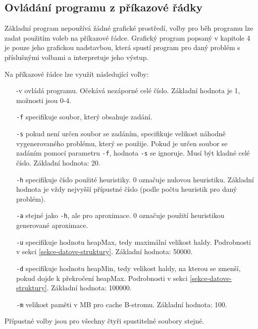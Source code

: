 \documentclass[12pt,notitlepage,fleqn]{report} %
\theoremstyle{definition}
\newcommand{\code}[1]{\texttt{#1}}
\begin{document}
  \subsection{Ovládání programu z příkazové řádky}
  Základní program nepoužívá žádné grafické prostředí, volby pro běh programu lze zadat použitím voleb na příkazové řádce. Grafický program popsaný v kapitole 4 je pouze jeho grafickou nadstavbou, která spustí program pro daný problém s příslušnými volbami a interpretuje jeho výstup.
  
  Na příkazové řádce lze využít následující volby:
  \begin{enumerate}
   \item[-v] ovládá  programu. Očekává nezáporné celé číslo. Základní hodnota je 1, možnosti jsou 0-4.
   \item[\code{-f}] specifikuje soubor, který obsahuje zadání.
   \item[\code{-s}] pokud není určen soubor se zadáním, specifikuje velikost náhodně vygenerovaného problému, který se použije. Pokud je určen soubor se zadáním pomocí parametru \code{-f}, hodnota \code{-s} se ignoruje. Musí být kladné celé číslo. Základní hodnota: 20.
   \item[\code{-h}] specifikuje číslo použité heuristiky. 0 označuje nulovou heuristiku. Základní hodnota je vždy nejvyšší přípustné číslo (podle počtu heuristik pro daný problém).
   \item[\code{-a}] stejné jako \code{-h}, ale pro aproximace. 0 označuje použití heuristikou generované aproximace.
   \item[\code{-u}] specifikuje hodnotu heapMax, tedy maximální velikost haldy. Podrobnosti v sekci \ref{sekce-datove-struktury}. Základní hodnota: 50000.
   \item[\code{-d}] specifikuje hodnotu heapMin, tedy velikost haldy, na kterou se zmenší, pokud dojde k překročení heapMax. Podrobnosti v sekci \ref{sekce-datove-struktury}. Základní hodnota: 100000.
   \item[\code{-m}] velikost paměti v MB pro cache B-stromu. Základní hodnota: 100.
  \end{enumerate}
  Přípustné volby jsou pro všechny čtyři spustitelné soubory stejné.
\end{document}
